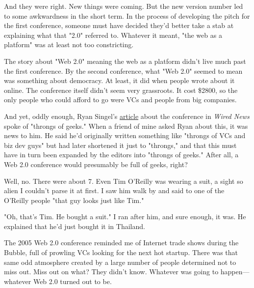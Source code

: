 And they were right. New things were coming.
                    But the new version number led to some awkwardness in the
                    short term. In the process of developing the pitch for the
                    first conference, someone must have decided they'd better
                    take a stab at explaining what that "2.0" referred to.
                    Whatever it meant, "the web as a platform" was at least not
                    too constricting.

The story about "Web 2.0"
                    meaning the web as a platform didn't live much past the
                    first conference. By the second conference, what "Web 2.0"
                    seemed to mean was something about democracy. At least, it
                    did when people wrote about it online. The conference itself
                    didn't seem very grassroots. It cost \$2800, so the only
                    people who could afford to go were VCs and people from big
                    companies.

And yet, oddly enough, Ryan Singel's
                    \href{http://www.wired.com/news/technology/0,1282,69114,00.html}{article}
                    about the conference in \emph{Wired News} spoke of "throngs
                    of geeks." When a friend of mine asked Ryan about this, it
                    was news to him. He said he'd originally written something
                    like "throngs of VCs and biz dev guys" but had later
                    shortened it just to "throngs," and that this must have in
                    turn been expanded by the editors into "throngs of geeks."
                    After all, a Web 2.0 conference would presumably be full of
                    geeks, right?

Well, no. There were about 7. Even
                    Tim O'Reilly was wearing a suit, a sight so alien I couldn't
                    parse it at first. I saw him walk by and said to one of the
                    O'Reilly people "that guy looks just like Tim."

"Oh,
                    that's Tim. He bought a suit." I ran after him, and sure
                    enough, it was. He explained that he'd just bought it in
                    Thailand.

The 2005 Web 2.0 conference reminded me
                    of Internet trade shows during the Bubble, full of prowling
                    VCs looking for the next hot startup. There was that same
                    odd atmosphere created by a large number of people
                    determined not to miss out. Miss out on what? They didn't
                    know. Whatever was going to happen---whatever Web 2.0
                    turned out to be.

